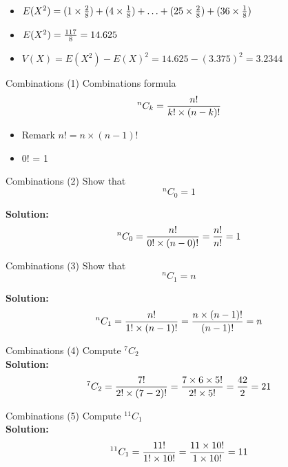 \documentclass[]{report}
\begin{document}
{{{{{{{	\begin{itemize}
		\item $E(X^2) = (1 \times {2\over8}) + (4 \times {1 \over 8}) +  \ldots + (25 \times {2 \over 8}) + (36 \times {1 \over 8})$\bigskip
		\item $E(X^2) = {117 \over 8} = 14.625$ \bigskip
		\item $V(X) = E(X^2) - E(X)^2 = 14.625 - (3.375)^2 = 3.2344$
	\end{itemize}
	\bigskip
	
}


	{Combinations (1)}
	Combinations formula
	\[ ^{n}C_k  = {n! \over k!  \times (n-k)!} \]
	
	\begin{itemize}
		\item Remark $n! = n \times (n-1)! $
		\item 0! = 1
	\end{itemize}


	{Combinations (2)}
	Show that
	\[ ^{n}C_0  = 1 \]
	
	\textbf{Solution: }
	\[ ^{n}C_0  = {n! \over 0!  \times (n-0)!} =  {n! \over n!} = 1 \]
	


	{Combinations (3)}
	Show that
	\[ ^{n}C_1  = n \]
	
	\textbf{Solution: }
	\[ ^{n}C_1  = {n! \over 1!  \times (n-1)!} =  {n \times (n-1)! \over (n-1)!} = n \]
	



	{Combinations (4)}
	Compute $ ^{7}C_2  $\\
	
	\textbf{Solution: }
	\[ ^{7}C_2  = {7! \over 2!  \times (7-2)!} =  {7 \times 6 \times 5! \over 2! \times 5!} = {42 \over 2} =21  \]
	


	{Combinations (5)}
	Compute $ ^{11}C_1  $\\
	
	\textbf{Solution: }
	\[ ^{11}C_1  = {11! \over 1!  \times 10!} =  {11 \times 10! \over 1 \times 10!} = 11 \]
	


}}}}}}
\end{document}
